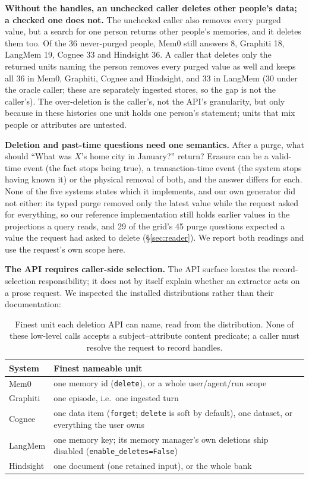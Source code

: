 \documentclass[conference]{IEEEtran}
\begin{document}
\textbf{Without the handles, an unchecked caller deletes other people's data;
a checked one does not.} The unchecked caller also removes every purged value,
but a search for one person returns other people's memories, and it deletes them
too. Of the 36 never-purged people, Mem0 still answers 8, Graphiti 18, LangMem
19, Cognee 33 and Hindsight 36. A caller that deletes only the returned units
naming the person removes every purged value as well and keeps all 36 in Mem0,
Graphiti, Cognee and Hindsight, and 33 in LangMem (30 under the oracle caller;
these are separately ingested stores, so the gap is not the caller's). The over-deletion is the caller's, not the API's granularity, but only
because in these histories one unit holds one person's statement; units that
mix people or attributes are untested.

\textbf{Deletion and past-time questions need one semantics.} After a purge,
what should ``What was $X$'s home city in January?'' return? Erasure can be a
valid-time event (the fact stops being true), a transaction-time event (the
system stops having known it) or the physical removal of both, and the answer
differs for each. None of the five systems states which it implements, and our
own generator did not either: its typed purge removed only the latest value
while the request asked for everything, so our reference implementation still
holds earlier values in the projections a query reads, and 29 of the grid's 45
purge questions expected a value the request had asked to delete
(\S\ref{sec:reader}). We report both readings and use the request's own scope
here.

\textbf{The API requires caller-side selection.} The API surface locates the
record-selection responsibility; it does not by itself explain whether an
extractor acts on a prose request.
We inspected the installed distributions rather than their documentation:

\begin{table}[t]
\centering
\caption{Finest unit each deletion API can name, read from the distribution.
None of these low-level calls accepts a subject--attribute content predicate;
a caller must resolve the request to record handles.}
\label{tab:deletion-api}
\small
\begin{tabular}{@{}l>{\raggedright\arraybackslash}p{4.6cm}@{}}
\toprule
System & Finest nameable unit \\
\midrule
Mem0      & one memory id (\texttt{delete}), or a whole user/agent/run scope \\
Graphiti  & one episode, i.e.\ one ingested turn \\
Cognee    & one data item (\texttt{forget}; \texttt{delete} is soft by default), one dataset, or everything the user owns \\
LangMem   & one memory key; its memory manager's own deletions ship disabled (\texttt{enable\_deletes=False}) \\
Hindsight & one document (one retained input), or the whole bank \\
\bottomrule
\end{tabular}
\end{table}
\end{document}
